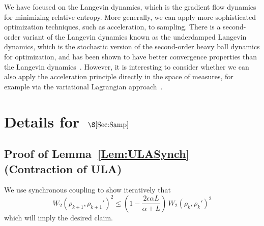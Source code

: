 \documentclass[final,12pt]{colt2018}
\begin{document}
We have focused on the Langevin dynamics, which is the gradient flow dynamics for minimizing relative entropy.
More generally, we can apply more sophisticated optimization techniques, such as acceleration, to sampling. 
There is a second-order variant of the Langevin dynamics known as the underdamped Langevin dynamics, which is the stochastic version of the second-order heavy ball dynamics for optimization, and has been shown to have better convergence properties than the Langevin dynamics~\citep{CCBJ17}.
However, it is interesting to consider whether we can also apply the acceleration principle directly in the space of measures, for example via the variational Lagrangian approach~\citep{WWJ16}.




\newpage
\appendix

\section{Details for~$\S\ref{Sec:Samp}$}

\subsection{Proof of Lemma~\ref{Lem:ULASynch} (Contraction of ULA)}
\label{App:ULASynch}

We use synchronous coupling to show iteratively that
$$W_2(\rho_{k+1},\rho_{k+1}')^2 \le \left(1-\frac{2\epsilon \alpha L}{\alpha+L}\right) \, W_2(\rho_k,\rho_k')^2$$
which will imply the desired claim.
\end{document}
